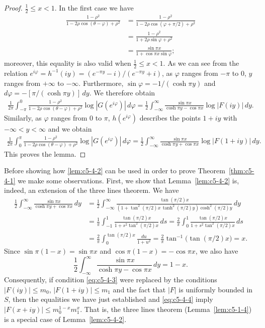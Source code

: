 \begin{proof}
$\frac{1}{2} \leq x < 1$. In the first case we have
\begin{align*}
\frac{1-\rho^{2}}{1-2\rho\cos(\theta-\varphi)+\rho^{2}}
&=\frac{1-\rho^{2}}{1-2\rho\cos(\varphi+\pi/2)+\rho^{2}}\\
&=\frac{1-\rho^{2}}{1+2\rho\sin\varphi+\rho^{2}}\\
&=\frac{\sin\pi x}{1+\cos\pi x\sin\varphi};
\end{align*}
moreover, this equality is also valid when $\frac{1}{2} \leq x < 1$. As we can
see from the relation
$e^{i\varphi} = h^{-1}(iy) = (e^{-\pi y} - i)/(e^{-\pi y} + i)$, as $\varphi$
ranges from $-\pi$ to 0, $y$ ranges from $+\infty$ to $-\infty$. Furthermore,
$\sin\varphi = -1/(\cosh\pi y)$ and
$d\varphi = -[\pi/(\cosh\pi y)]\,dy$. We therefore obtain
\begin{align*}
\frac{1}{2\pi}\int_{-\pi}^{0}\frac{1-\rho^{2}}{1-2\rho\cos(\theta-\varphi)+\rho^{2}}\log|G(e^{i\varphi})|\,d\varphi
=\frac{1}{2}\int_{-\infty}^{\infty}\frac{\sin\pi x}{\cosh\pi y-\cos\pi x}\log|F(iy)|\,dy.
\end{align*}
Similarly, as $\varphi$ ranges from 0 to $\pi$, $h(e^{i\varphi})$ describes the
points $1 + iy$ with $-\infty < y < \infty$ and we obtain
\begin{align*}
\frac{1}{2\pi}\int_{0}^{\pi}\frac{1-\rho^{2}}{1-2\rho\cos(\theta-\varphi)+\rho^{2}}\log|G(e^{i\varphi})|\,d\varphi
=\frac{1}{2}\int_{-\infty}^{\infty}\frac{\sin\pi x}{\cosh\pi y+\cos\pi x}\log|F(1+iy)|\,dy.
\end{align*}
This proves the lemma.
\end{proof}

Before showing how \eqref{lem:c5-4-2} can be used in order to prove
Theorem~\ref{thm:c5-4-1} we make some observations. First, we show that
Lemma~\ref{lem:c5-4-2} is, indeed, an extension of the three lines theorem. We
have
\begin{align*}
\frac{1}{2}\int_{-\infty}^{\infty}\frac{\sin\pi x}{\cosh\pi y+\cos\pi x}\,dy
&=\frac{1}{2}\int_{-\infty}^{\infty}
\frac{\tan(\pi/2)x}{(1+\tan^{2}(\pi/2)x\,\tanh^{2}(\pi/2)y)\cosh^{2}(\pi/2)y}\,dy\\
&=\frac{1}{\pi}\int_{-1}^{1}\frac{\tan(\pi/2)x}{1+s^{2}\tan^{2}(\pi/2)x}\,ds
=\frac{2}{\pi}\int_{0}^{1}\frac{\tan(\pi/2)x}{1+s^{2}\tan^{2}(\pi/2)x}\,ds\\
&=\frac{2}{\pi}\int_{0}^{\tan(\pi/2)x}\frac{du}{1+u^{2}}
=\frac{2}{\pi}\tan^{-1}\bigl(\tan(\pi/2)x\bigr)=x.
\end{align*}
Since $\sin\pi(1-x) = \sin\pi x$ and $\cos\pi(1-x) = -\cos\pi x$, we also have
\[
\frac{1}{2}\int_{-\infty}^{\infty}\frac{\sin\pi x}{\cosh\pi y-\cos\pi x}\,dy=1-x.
\]
Consequently, if condition \eqref{eq:c5-4-3} were replaced by the conditions
$|F(iy)| \leq m_{0}$, $|F(1 + iy)| \leq m_{1}$ and the fact that $|F|$ is
uniformly bounded in $S$, then the equalities we have just established and
\eqref{eq:c5-4-4} imply $|F(x + iy)| \leq m_{0}^{1-x}m_{1}^{x}$. That is, the
three lines theorem (Lemma~\ref{lem:c5-1-4}) is a special case of
Lemma~\ref{lem:c5-4-2}.

